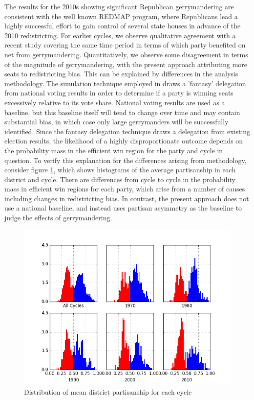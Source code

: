 \documentclass[preprint,12pt]{article}
\begin{document}
The results for the 2010s showing significant Republican gerrymandering are consistent with the well known REDMAP program, where Republicans lead a highly successful effort to gain control of several state houses in advance of the 2010 redistricting.
For earlier cycles, we observe qualitative agreement with a recent study covering the same time period \cite{Wang_2017_} in terms of which party benefited on net from gerrymandering.
Quantitatively, we observe some disagreement in terms of the magnitude of gerrymandering, with the present approach attributing more seats to redistricting bias.
This can be explained by differences in the analysis methodology.
The simulation technique employed in \cite{Wang_2017_} draws a 'fantasy' delegation from national voting results in order to determine if a party is winning seats excessively relative to its vote share\cite{Wang__}.
National voting results are used as a baseline, but this baseline itself will tend to change over time and may contain substantial bias, in which case only large gerrymanders will be successfully identified. 
Since the fantasy delegation technique draws a delegation from existing election results, the likelihood of a highly disproportionate outcome depends on the probability mass in the efficient win region for the party and cycle in question.
To verify this explanation for the differences arising from methodology, consider figure \ref{fig:meanHist}, which shows histograms of the average partisanship in each district and cycle.
There are differences from cycle to cycle in the probability mass in efficient win regions for each party, which arise from a number of causes including changes in redistricting bias.
In contrast, the present approach does not use a national baseline, and instead uses partisan asymmetry as the baseline to judge the effects of gerrymandering.
\begin{figure}[htb!]
    \begin{center}
        \includegraphics[scale=0.8]{../Figures/HistoricAsymmetry/MeanHist.png}
        \caption{Distribution of mean district partisanship for each cycle}\label{fig:meanHist}
    \end{center}
\end{figure}
\end{document}
